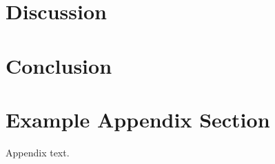 \documentclass[preprint,12pt,authoryear]{elsarticle}
\begin{document}
\section{Discussion}
\label{sec:discussion}

\section{Conclusion}
\label{sec:conclusion}




\appendix
\section{Example Appendix Section}
\label{app1}

Appendix text.



\end{document}
